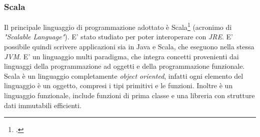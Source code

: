 \subsubsection{Scala}
Il principale linguaggio di programmazione adottato è Scala\footcite{http://www.scala-lang.org/} (acronimo di \emph{"Scalable Language"}). E' stato studiato per poter interoperare con \emph{JRE}. E' possibile quindi scrivere applicazioni sia in Java e Scala, che eseguono nella stessa \emph{JVM}. E' un linguaggio multi paradigma, che integra concetti provenienti dai linguaggi della programmazione ad oggetti e della programmazione funzionale. Scala è un linguaggio completamente \emph{object oriented}, infatti ogni elemento del linguaggio è un oggetto, compresi i tipi primitivi e le funzioni. Inoltre è un linguaggio funzionale, include funzioni di prima classe e una libreria con strutture dati immutabili efficienti.
